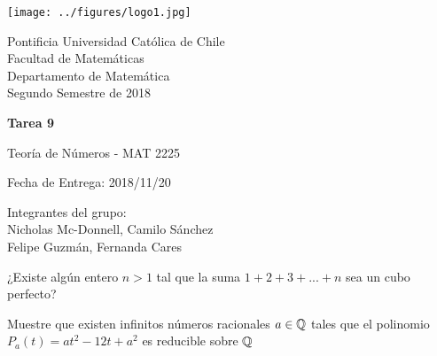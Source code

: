 


\begin{minipage}{2.5cm}
	\texttt{[image: ../figures/logo1.jpg]}
\end{minipage}
\begin{minipage}{13cm}
	\begin{flushleft}
		\raggedright
		{
			\noindent
			{\sc Pontificia Universidad Católica de Chile\\
				Facultad de Matemáticas\\
				Departamento de Matemática} \smallskip \\
			Segundo Semestre de 2018\\
		}
	\end{flushleft}
\end{minipage}

\vspace{2ex}
{\Large \centerline{\bf Tarea 9}}
{\large \centerline{Teoría de Números - MAT 2225}}
\centerline{Fecha de Entrega: 2018/11/20}

\begin{flushright}
	Integrantes del grupo:\\
	Nicholas Mc-Donnell, Camilo Sánchez\\
	Felipe Guzmán, Fernanda Cares
\end{flushright}

\begin{prob}[10 pts.]
    ¿Existe algún entero $n>1$ tal que la suma $1+2+3+...+n$ sea un cubo perfecto?
\end{prob}

\begin{sol}
    
\end{sol}

\begin{prob}[10 pts.]
    Muestre que existen infinitos números racionales $a\in\mathbb{Q}$ tales que el polinomio $P_a(t)=at^2-12t+a^2$ es reducible sobre $\mathbb{Q}$
\end{prob}

\begin{sol}
    
\end{sol}

